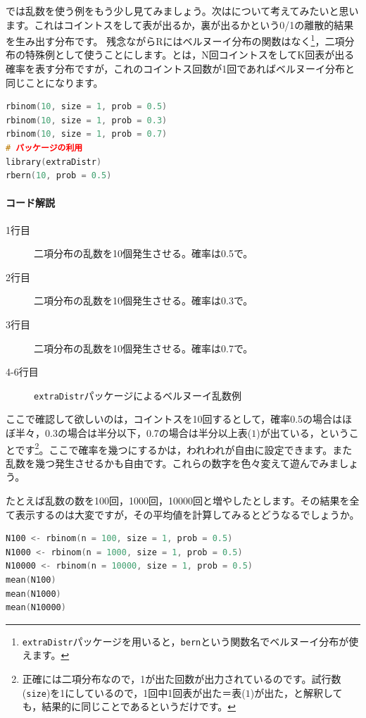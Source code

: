 \documentclass{ltjsbook}
\begin{document}
では乱数を使う例をもう少し見てみましょう。次はについて考えてみたいと思います。これはコイントスをして表が出るか，裏が出るかという0/1の離散的結果を生み出す分布です。
残念ながらRにはベルヌーイ分布の関数はなく\footnote{\texttt{extraDistr}パッケージを用いると，\texttt{bern}という関数名でベルヌーイ分布が使えます。}，二項分布の特殊例として使うことにします。とは，N回コイントスをしてK回表が出る確率を表す分布ですが，これのコイントス回数が1回であればベルヌーイ分布と同じことになります。
\begin{lstlisting}[language=c++,label={code::17_02},caption={乱数のコードの例2}]
rbinom(10, size = 1, prob = 0.5)
rbinom(10, size = 1, prob = 0.3)
rbinom(10, size = 1, prob = 0.7)
# パッケージの利用
library(extraDistr)
rbern(10, prob = 0.5)
\end{lstlisting}
\paragraph{コード解説}
\begin{description}
        \item[1行目] 二項分布の乱数を10個発生させる。確率は0.5で。
        \item[2行目] 二項分布の乱数を10個発生させる。確率は0.3で。
        \item[3行目] 二項分布の乱数を10個発生させる。確率は0.7で。
        \item[4-6行目] \texttt{extraDistr}パッケージによるベルヌーイ乱数例
\end{description}

ここで確認して欲しいのは，コイントスを10回するとして，確率0.5の場合はほぼ半々，0.3の場合は半分以下，0.7の場合は半分以上表($1$)が出ている，ということです\footnote{正確には二項分布なので，1が出た回数が出力されているのです。試行数(\texttt{size})を1にしているので，1回中1回表が出た＝表($1$)が出た，と解釈しても，結果的に同じことであるというだけです。}。ここで確率を幾つにするかは，われわれが自由に設定できます。また乱数を幾つ発生させるかも自由です。これらの数字を色々変えて遊んでみましょう。

たとえば乱数の数を100回，1000回，10000回と増やしたとします。その結果を全て表示するのは大変ですが，その平均値を計算してみるとどうなるでしょうか。
\begin{lstlisting}[language=c++,label={code::17_03},caption={乱数のコードの例3}]
N100 <- rbinom(n = 100, size = 1, prob = 0.5)
N1000 <- rbinom(n = 1000, size = 1, prob = 0.5)
N10000 <- rbinom(n = 10000, size = 1, prob = 0.5)
mean(N100)
mean(N1000)
mean(N10000)
\end{lstlisting}
\end{document}
